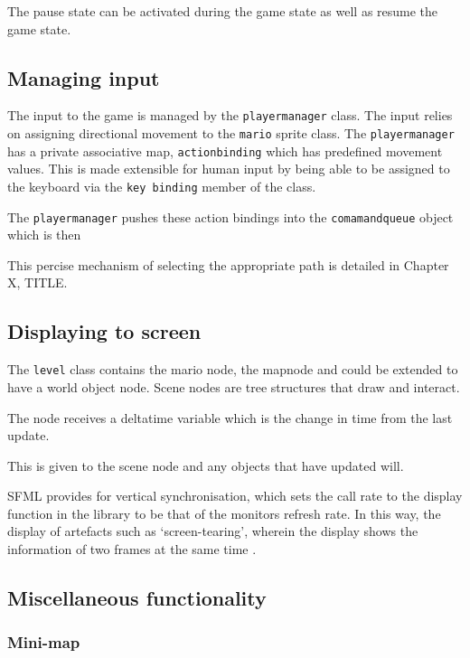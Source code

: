 \documentclass[11pt, a4paper, oneside]{report} %
\begin{document}
The pause state can be activated during the game \textunderscore state as well
as resume the game state.

\subsection{Managing input}

The input to the game is managed by the \texttt{player\textunderscore manager}
class. The input relies on assigning directional movement to the \texttt{mario}
sprite class. The \texttt{player\textunderscore manager} has a private
associative map, \texttt{action\textunderscore binding} which has
predefined movement values. This is made extensible for human input by being
able to be assigned to the keyboard via the \texttt{key\textunderscore
binding} member of the class.

The \texttt{player\textunderscore manager} pushes these action bindings into the
\texttt{comamand\textunderscore queue} object which is then 

This percise mechanism of selecting the appropriate path is detailed in Chapter
X, TITLE.

\subsection{Displaying to screen}

The \texttt{level} class contains the mario node, the mapnode and could be
extended to have a world object node.  Scene nodes are tree structures that draw
and interact.

The node receives a delta\textunderscore time variable which is the change in
time from the last update.

This is given to the scene node and any objects that have updated will. 

SFML provides for vertical synchronisation, which sets the call rate to the
display function in the library to be that of the monitors refresh rate. In this
way, the display of artefacts such as `screen-tearing', wherein the display
shows the information of two frames at the same time
\cite{Haller:2013:SGD:2556030}.

\subsection{Miscellaneous functionality}

\subsubsection{Mini-map}
\end{document}
